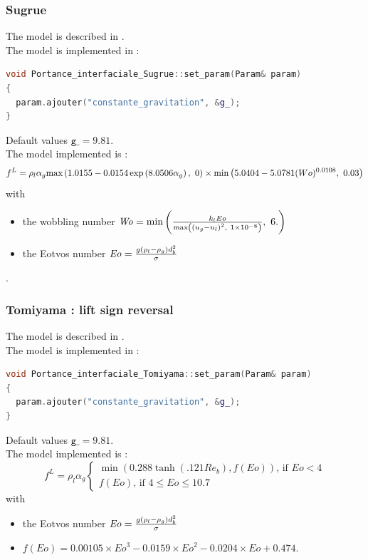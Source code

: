 \subsubsection{Sugrue}
The model is described in .\\
The model is implemented in :
\begin{lstlisting}[language=c++]
void Portance_interfaciale_Sugrue::set_param(Param& param)
{
  param.ajouter("constante_gravitation", &g_);
}
\end{lstlisting}
Default values $\texttt{g\_}=9.81$.\\
The model implemented is :
\begin{equation}
   f^{L} = \rho_l\alpha_g \text{max}\left( 1.0155-0.0154\exp\left( 8.0506\alpha_g \right),\ 0 \right) \times \text{min}\left( 5.0404-5.0781(Wo)^{0.0108},\ 0.03 \right)
\end{equation}
with
\begin{itemize}
    \item[\small \textcolor{blue}{\ding{109}}]the wobbling number $\mathit{Wo}=\text{min}\parent{\frac{k_lEo}{\text{max}\parent{\parent{u_g-u_l}^2,\ \num{1e-8}}},\ 6.}$
    \item[\small \textcolor{blue}{\ding{109}}]the Eotvos number $\mathit{Eo}=\frac{g\left( \rho_l-\rho_g \right) d_b^2}{\sigma}$
\end{itemize}.

%
\subsubsection{Tomiyama : lift sign reversal}
The model is described in \cite{Tomiyama2002}.\\
The model is implemented in :
\begin{lstlisting}[language=c++]
void Portance_interfaciale_Tomiyama::set_param(Param& param)
{
  param.ajouter("constante_gravitation", &g_);
}
\end{lstlisting}
Default values $\texttt{g\_}=9.81$.\\
The model implemented is :
\begin{equation}
   f^{L} = \rho_l\alpha_g\begin{cases}
   \min(0.288\tanh(.121Re_b),f(\mathit{Eo}))\text{, if } \mathit{Eo}<4 \\
   f(\mathit{Eo}) \text{, if } 4 \leq \mathit{Eo} \leq 10.7 \end{cases}
\end{equation}
with
\begin{itemize}
\item[\small \textcolor{blue}{\ding{109}}]the Eotvos number $\mathit{Eo}=\frac{g\left( \rho_l-\rho_g \right) d_b^2}{\sigma}$
\item[\small \textcolor{blue}{\ding{109}}]$f(\mathit{Eo}) = 0.00105\times{}\mathit{Eo}^3 - 0.0159\times{}\mathit{Eo}^2 - 0.0204\times{} \mathit{Eo} + 0.474$.
\end{itemize}

